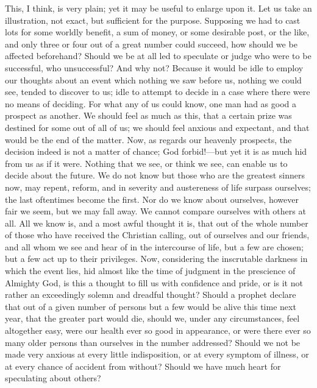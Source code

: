 This, I think, is very plain; yet it may be useful to enlarge upon
it. Let us take an illustration, not exact, but sufficient for the
purpose. Supposing we had to cast lots for some worldly benefit, a sum
of money, or some desirable post, or the like, and only three or four
out of a great number could succeed, how should we be affected
beforehand? Should we be at all led to speculate or judge who were to
be successful, who unsuccessful? And why not? Because it would be idle
to employ our thoughts about an event which nothing we saw before us,
nothing we could see, tended to discover to us; idle to attempt to
decide in a case where there were no means of deciding. For what any
of us could know, one man had as good a prospect as another. We should
feel as much as this, that a certain prize was destined for some out
of all of us; we should feel anxious and expectant, and that would be
the end of the matter. Now, as regards our heavenly prospects, the
decision indeed is not a matter of chance; God forbid!—but yet it is
as much hid from us as if it were. Nothing that we see, or think we
see, can enable us to decide about the future. We do not know but
those who are the greatest sinners now, may repent, reform, and in
severity and austereness of life surpass ourselves; the last
oftentimes become the first. Nor do we know about ourselves, however
fair we seem, but we may fall away. We cannot compare ourselves with
others at all. All we know is, and a most awful thought it is, that
out of the whole number of those who have received the Christian
calling, out of ourselves and our friends, and all whom we see and
hear of in the intercourse of life, but a few are chosen; but a few
act up to their privileges. Now, considering the inscrutable darkness
in which the event lies, hid almost like the time of judgment in the
prescience of Almighty God, is this a thought to fill us with
confidence and pride, or is it not rather an exceedingly solemn and
dreadful thought? Should a prophet declare that out of a given number
of persons but a few would be alive this time next year, that the
greater part would die, should we, under any circumstances, feel
altogether easy, were our health ever so good in appearance, or were
there ever so many older persons than ourselves in the number
addressed? Should we not be made very anxious at every little
indisposition, or at every symptom of illness, or at every chance of
accident from without? Should we have much heart for speculating about
others?

